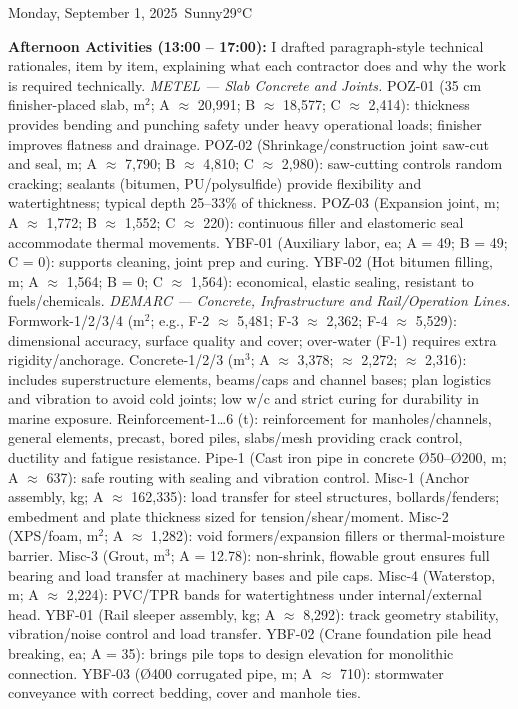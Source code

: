 \begin{dailyentry}{Monday, September 1, 2025}{\weathersunny\ Sunny}{29°C}
\begin{workcontent}
\textbf{Afternoon Activities (13:00 – 17:00):} I drafted paragraph-style technical rationales, item by item, explaining what each contractor does and why the work is required technically.
\emph{METEL — Slab Concrete and Joints.} POZ-01 (35 cm finisher-placed slab, m$^2$; A $\approx$ 20{,}991; B $\approx$ 18{,}577; C $\approx$ 2{,}414): thickness provides bending and punching safety under heavy operational loads; finisher improves flatness and drainage. POZ-02 (Shrinkage/construction joint saw-cut and seal, m; A $\approx$ 7{,}790; B $\approx$ 4{,}810; C $\approx$ 2{,}980): saw-cutting controls random cracking; sealants (bitumen, PU/polysulfide) provide flexibility and watertightness; typical depth 25–33\% of thickness. POZ-03 (Expansion joint, m; A $\approx$ 1{,}772; B $\approx$ 1{,}552; C $\approx$ 220): continuous filler and elastomeric seal accommodate thermal movements. YBF-01 (Auxiliary labor, ea; A = 49; B = 49; C = 0): supports cleaning, joint prep and curing. YBF-02 (Hot bitumen filling, m; A $\approx$ 1{,}564; B = 0; C $\approx$ 1{,}564): economical, elastic sealing, resistant to fuels/chemicals.
\emph{DEMARC — Concrete, Infrastructure and Rail/Operation Lines.} Formwork-1/2/3/4 (m$^2$; e.g., F-2 $\approx$ 5{,}481; F-3 $\approx$ 2{,}362; F-4 $\approx$ 5{,}529): dimensional accuracy, surface quality and cover; over-water (F-1) requires extra rigidity/anchorage. Concrete-1/2/3 (m$^3$; A $\approx$ 3{,}378; $\approx$ 2{,}272; $\approx$ 2{,}316): includes superstructure elements, beams/caps and channel bases; plan logistics and vibration to avoid cold joints; low w/c and strict curing for durability in marine exposure. Reinforcement-1…6 (t): reinforcement for manholes/channels, general elements, precast, bored piles, slabs/mesh providing crack control, ductility and fatigue resistance. Pipe-1 (Cast iron pipe in concrete Ø50–Ø200, m; A $\approx$ 637): safe routing with sealing and vibration control. Misc-1 (Anchor assembly, kg; A $\approx$ 162{,}335): load transfer for steel structures, bollards/fenders; embedment and plate thickness sized for tension/shear/moment. Misc-2 (XPS/foam, m$^2$; A $\approx$ 1{,}282): void formers/expansion fillers or thermal-moisture barrier. Misc-3 (Grout, m$^3$; A = 12.78): non-shrink, flowable grout ensures full bearing and load transfer at machinery bases and pile caps. Misc-4 (Waterstop, m; A $\approx$ 2{,}224): PVC/TPR bands for watertightness under internal/external head. YBF-01 (Rail sleeper assembly, kg; A $\approx$ 8{,}292): track geometry stability, vibration/noise control and load transfer. YBF-02 (Crane foundation pile head breaking, ea; A = 35): brings pile tops to design elevation for monolithic connection. YBF-03 (Ø400 corrugated pipe, m; A $\approx$ 710): stormwater conveyance with correct bedding, cover and manhole ties.


\end{workcontent}
\end{dailyentry}
